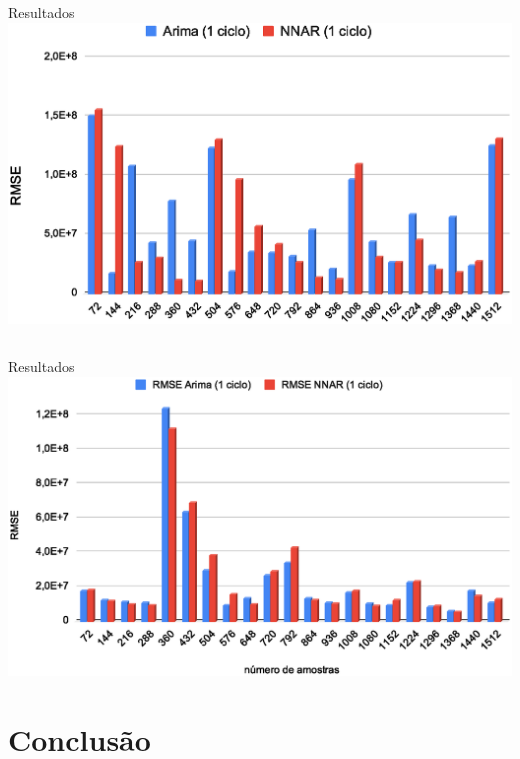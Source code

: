 \documentclass[aspectratio=169]{beamer}
\begin{document}

\subsection{}
\begin{frame}{Resultados}
    \centering
\includegraphics[height=0.47\textwidth,angle=0]{rmse_tsoriginal.eps}
\end{frame}


\subsection{}
\begin{frame}{Resultados}
    \centering
\includegraphics[height=0.50\textwidth,angle=0]{rmse_tsclean.eps}
\end{frame}


\section{Conclusão}
\end{document}
